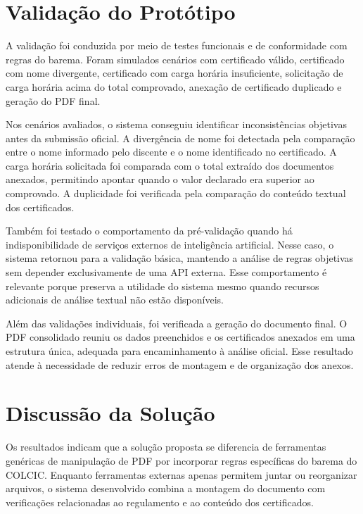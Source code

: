 
\section{Validação do Protótipo}

A validação foi conduzida por meio de testes funcionais e de conformidade com regras do barema. Foram simulados cenários com certificado válido, certificado com nome divergente, certificado com carga horária insuficiente, solicitação de carga horária acima do total comprovado, anexação de certificado duplicado e geração do PDF final.


Nos cenários avaliados, o sistema conseguiu identificar inconsistências objetivas antes da submissão oficial. A divergência de nome foi detectada pela comparação entre o nome informado pelo discente e o nome identificado no certificado. A carga horária solicitada foi comparada com o total extraído dos documentos anexados, permitindo apontar quando o valor declarado era superior ao comprovado. A duplicidade foi verificada pela comparação do conteúdo textual dos certificados.

Também foi testado o comportamento da pré-validação quando há indisponibilidade de serviços externos de inteligência artificial. Nesse caso, o sistema retornou para a validação básica, mantendo a análise de regras objetivas sem depender exclusivamente de uma API externa. Esse comportamento é relevante porque preserva a utilidade do sistema mesmo quando recursos adicionais de análise textual não estão disponíveis.

Além das validações individuais, foi verificada a geração do documento final. O PDF consolidado reuniu os dados preenchidos e os certificados anexados em uma estrutura única, adequada para encaminhamento à análise oficial. Esse resultado atende à necessidade de reduzir erros de montagem e de organização dos anexos.

\section{Discussão da Solução}

Os resultados indicam que a solução proposta se diferencia de ferramentas genéricas de manipulação de PDF por incorporar regras específicas do barema do COLCIC. Enquanto ferramentas externas apenas permitem juntar ou reorganizar arquivos, o sistema desenvolvido combina a montagem do documento com verificações relacionadas ao regulamento e ao conteúdo dos certificados.

